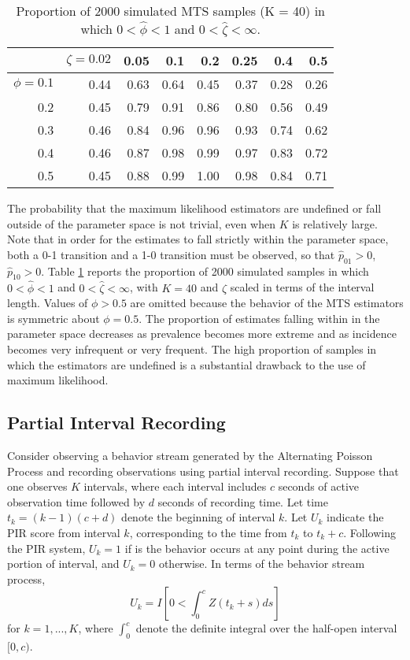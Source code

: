 \documentclass[man, noextraspace, floatsintext]{apa6}\usepackage[]{graphicx}\usepackage[]{color}
\begin{document}
\begin{table}[b]
\centering
\caption{Proportion of 2000 simulated MTS samples (K = 40) in which $0 < \hat\phi < 1$ and $0 < \hat\zeta < \infty$.} 
\label{tab:MTS_zeta_valid}
\begin{tabular}{rrrrrrrr}
  \hline
 & $\zeta = 0.02$ & 0.05 & 0.1 & 0.2 & 0.25 & 0.4 & 0.5 \\ 
  \hline
$\phi = 0.1$ & 0.44 & 0.63 & 0.64 & 0.45 & 0.37 & 0.28 & 0.26 \\ 
  0.2 & 0.45 & 0.79 & 0.91 & 0.86 & 0.80 & 0.56 & 0.49 \\ 
  0.3 & 0.46 & 0.84 & 0.96 & 0.96 & 0.93 & 0.74 & 0.62 \\ 
  0.4 & 0.46 & 0.87 & 0.98 & 0.99 & 0.97 & 0.83 & 0.72 \\ 
  0.5 & 0.45 & 0.88 & 0.99 & 1.00 & 0.98 & 0.84 & 0.71 \\ 
   \hline
\end{tabular}
\end{table}


The probability that the maximum likelihood estimators are undefined or fall outside of the parameter space is not trivial, even when $K$ is relatively large. Note that in order for the estimates to fall strictly within the parameter space, both a 0-1 transition and a 1-0 transition must be observed, so that $\hat{p}_{01} > 0$, $\hat{p}_{10} > 0$. Table \ref{tab:MTS_zeta_valid} reports the proportion of 2000 simulated samples in which $0 < \hat\phi < 1$ and $0 < \hat\zeta < \infty$, with $K = 40$ and $\zeta$ scaled in terms of the interval length. Values of $\phi > 0.5$ are omitted because the behavior of the MTS estimators is symmetric about $\phi = 0.5$. The proportion of estimates falling within in the parameter space decreases as prevalence becomes more extreme and as incidence becomes very infrequent or very frequent. The high proportion of samples in which the estimators are undefined is a substantial drawback to the use of maximum likelihood.

\subsection{Partial Interval Recording}
\label{subsec:PIR}

Consider observing a behavior stream generated by the Alternating Poisson Process and recording observations using partial interval recording. Suppose that one observes $K$ intervals, where each interval includes $c$ seconds of active observation time followed by $d$ seconds of recording time. Let time $t_k = (k-1)(c + d)$ denote the beginning of interval $k$. Let $U_k$ indicate the PIR score from interval $k$, corresponding to the time from $t_k$ to $t_k + c$. Following the PIR system, $U_k = 1$ if is the behavior occurs at any point during the active portion of interval, and $U_k = 0$ otherwise. In terms of the behavior stream process, 
\begin{equation}
U_k = I\left[ 0 < \int_0^c Z\left(t_k + s \right) ds\right]
\end{equation}
for $k = 1,...,K$, where $\int_0^c$ denote the definite integral over the half-open interval $[0,c)$.
\end{document}
